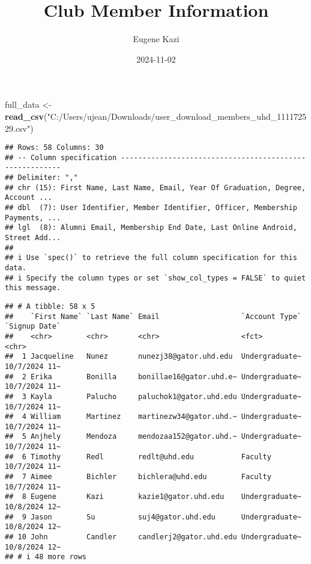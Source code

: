 \documentclass[
]{article}
\title{Club Member Information}
\author{Eugene Kazi}
\date{2024-11-02}
\newenvironment{Shaded}{\begin{snugshade}}{\end{snugshade}}
\newcommand{\FunctionTok}[1]{\textcolor[rgb]{0.13,0.29,0.53}{\textbf{#1}}}
\newcommand{\NormalTok}[1]{#1}
\newcommand{\OtherTok}[1]{\textcolor[rgb]{0.56,0.35,0.01}{#1}}
\newcommand{\SpecialCharTok}[1]{\textcolor[rgb]{0.81,0.36,0.00}{\textbf{#1}}}
\newcommand{\StringTok}[1]{\textcolor[rgb]{0.31,0.60,0.02}{#1}}
\begin{document}
\maketitle

\begin{Shaded}
\begin{Highlighting}[]
\NormalTok{full\_data }\OtherTok{\textless{}{-}} \FunctionTok{read\_csv}\NormalTok{(}\StringTok{"C:/Users/ujean/Downloads/user\_download\_members\_uhd\_111172529.csv"}\NormalTok{)}
\end{Highlighting}
\end{Shaded}

\begin{verbatim}
## Rows: 58 Columns: 30
## -- Column specification --------------------------------------------------------
## Delimiter: ","
## chr (15): First Name, Last Name, Email, Year Of Graduation, Degree, Account ...
## dbl  (7): User Identifier, Member Identifier, Officer, Membership Payments, ...
## lgl  (8): Alumni Email, Membership End Date, Last Online Android, Street Add...
## 
## i Use `spec()` to retrieve the full column specification for this data.
## i Specify the column types or set `show_col_types = FALSE` to quiet this message.
\end{verbatim}

\begin{Shaded}
\end{Shaded}

\begin{verbatim}
## # A tibble: 58 x 5
##    `First Name` `Last Name` Email                   `Account Type` `Signup Date`
##    <chr>        <chr>       <chr>                   <fct>          <chr>        
##  1 Jacqueline   Nunez       nunezj38@gator.uhd.edu  Undergraduate~ 10/7/2024 11~
##  2 Erika        Bonilla     bonillae16@gator.uhd.e~ Undergraduate~ 10/7/2024 11~
##  3 Kayla        Palucho     paluchok1@gator.uhd.edu Undergraduate~ 10/7/2024 11~
##  4 William      Martinez    martinezw34@gator.uhd.~ Undergraduate~ 10/7/2024 11~
##  5 Anjhely      Mendoza     mendozaa152@gator.uhd.~ Undergraduate~ 10/7/2024 11~
##  6 Timothy      Redl        redlt@uhd.edu           Faculty        10/7/2024 11~
##  7 Aimee        Bichler     bichlera@uhd.edu        Faculty        10/7/2024 11~
##  8 Eugene       Kazi        kazie1@gator.uhd.edu    Undergraduate~ 10/8/2024 12~
##  9 Jason        Su          suj4@gator.uhd.edu      Undergraduate~ 10/8/2024 12~
## 10 John         Candler     candlerj2@gator.uhd.edu Undergraduate~ 10/8/2024 12~
## # i 48 more rows
\end{verbatim}
\end{document}
